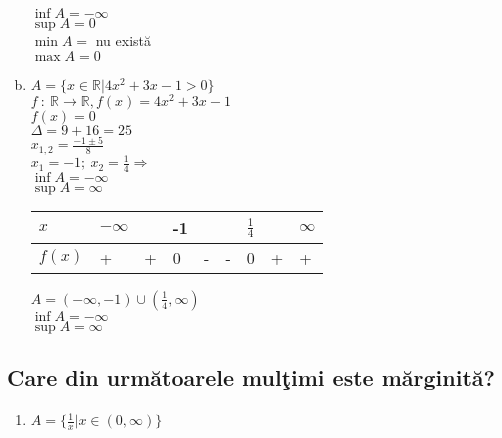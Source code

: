 \documentclass[a4paper, 12pt, notitlepage]{book}
\begin{document}
\begin{enumerate}[a.]
            $\inf A = -\infty$\\
            $\sup A = 0$\\
            $\min A =$ nu exist\u{a}\\
            $\max A = 0$

      \item $A = \{x \in \mathbb{R} \vert 4x^{2} +3x-1 > 0\}$\\
            $f\ :\ \mathbb{R} \to \mathbb{R}, f(x) = 4x^{2} +3x-1$\\
            $f(x) = 0$\\
            $\Delta = 9+16 = 25$\\
            $x_{1,2} = \frac{-1 \pm 5}{8}$\\
            $x_{1} = -1;\ x_{2} = \frac{1}{4} \Rightarrow $\\

            $\inf A = -\infty$\\
            $\sup A = \infty$\\

            \begin{table}[h]
              \begin{tabular}{l|llllllll}
                $x$    & $-\infty$ &   & -1 &   &   & $\frac{1}{4}$ &   & $\infty$  \\
                \hline
                $f(x)$ & +       & + & 0  & - & - & 0           & + & +
              \end{tabular}
            \end{table}

            $A = (-\infty, -1) \cup \left( \frac{1}{4}, \infty \right)$\\
            $\inf A = -\infty$\\
            $\sup A = \infty$
    \end{enumerate}

    \subsection{Care din urm\u{a}toarele mul\c{t}imi este m\u{a}rginit\u{a}?}
    \begin{enumerate}
            \item $A = \{ \frac{1}{x} \vert x \in (0,\infty) \}$
    \end{enumerate}
\end{document}
